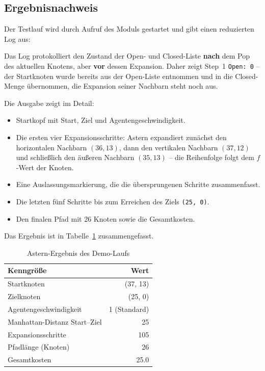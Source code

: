 
\subsection{Ergebnisnachweis}
\label{sssec:astar_3b_nachweis}

Der Testlauf wird durch Aufruf des Moduls gestartet und gibt einen reduzierten Log aus:



Das Log protokolliert den Zustand der Open- und Closed-Liste \textbf{nach} dem Pop
des aktuellen Knotens, aber \textbf{vor} dessen Expansion. Daher zeigt Step~1
\texttt{Open: 0} -- der Startknoten wurde bereits aus der Open-Liste entnommen und
in die Closed-Menge übernommen, die Expansion seiner Nachbarn steht noch aus.

Die Ausgabe zeigt im Detail:
\begin{itemize}
    \item Startkopf mit Start, Ziel und Agentengeschwindigkeit.
    \item Die ersten vier Expansionsschritte: \acs{Astern} expandiert zunächst den
          horizontalen Nachbarn \((36,13)\), dann den vertikalen Nachbarn \((37,12)\)
          und schließlich den äußeren Nachbarn \((35,13)\) -- die Reihenfolge folgt
          dem \(f\)-Wert der Knoten.
    \item Eine Auslassungsmarkierung, die die übersprungenen Schritte zusammenfasst.
    \item Die letzten fünf Schritte bis zum Erreichen des Ziels \texttt{(25, 0)}.
    \item Den finalen Pfad mit 26 Knoten sowie die Gesamtkosten.
\end{itemize}

Das Ergebnis ist in Tabelle~\ref{tab:astar_3b} zusammengefasst.

\begin{table}[H]
    \centering
    \begin{tabular}{l r}
        \toprule
        \textbf{Kenngröße} & \textbf{Wert} \\
        \midrule
        Startknoten                  & (37, 13) \\
        Zielknoten                   & (25, 0) \\
        Agentengeschwindigkeit       & 1 (Standard) \\
        Manhattan-Distanz Start--Ziel & 25 \\
        Expansionsschritte           & 105 \\
        Pfadlänge (Knoten)           & 26 \\
        Gesamtkosten                 & 25.0 \\
        \bottomrule
    \end{tabular}
    \caption{\acs{Astern}-Ergebnis des Demo-Laufs}
    \label{tab:astar_3b}
\end{table}

